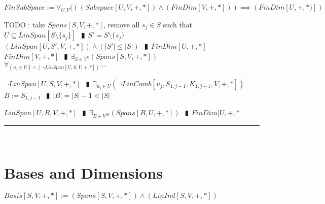 \documentclass{book}
\newcommand{\abr}{:=}
\newcommand{\pipe}{$\phantom{(}\vrectangleblack\phantom{)}$}
\begin{document}
$FinSubSpace \abr \forall_{U, V}(((Subspace[U, V, +, *])\land (FinDim[V, +, *])) \implies (FinDim[U, +, *)])$
\begin{enumerate}
  \lit TODO : take $Spans[S, V, +, *]$, remove all $s_j \in S$ such that $U \subseteq LinSpan[S \setminus \{s_j\}]$ \pipe $S' = S \setminus \{s_j\}$ \\
    $(LinSpan[U, S', V, +, *]) \land (|S'| \leq |S|)$ \pipe $FinDim[U, +, *]$
  \lit $FinDim[V, +, *]$ \pipe $\exists_{S \in V^n}(Spans[S, V, +, *])$
  \lit $\forall_{(u_j \in U) \land (\lnot LinSpan[U, S, V, +, *])} \ldots$
  \begin{enumerate}
    \lit $\lnot LinSpan[U, S, V, +, *]$ \pipe $\exists_{u_j \in U}(\lnot LinComb[u_j, S_{1, j - 1}, K_{1, j - 1}, V, +, *])$
    \lit $B \abr S_{1, j - 1}$ \pipe $|B| = |S| - 1 < |S|$
  \end{enumerate}
  \lit $LinSpan[U, B, V, +, *]$ \pipe $\exists_{B \in V^M}(Spans[B, U, +, *])$ \pipe $FinDim[U, +, *$
\end{enumerate} \vspace{.75mm} \hrule \vspace{.75mm} \ \\ 

\section{Bases and Dimensions}
$Basis[S, V, +, *] \abr (Spans[S, V, +, *]) \land (LinInd[S, V, +, *])$ \\
\end{document}
